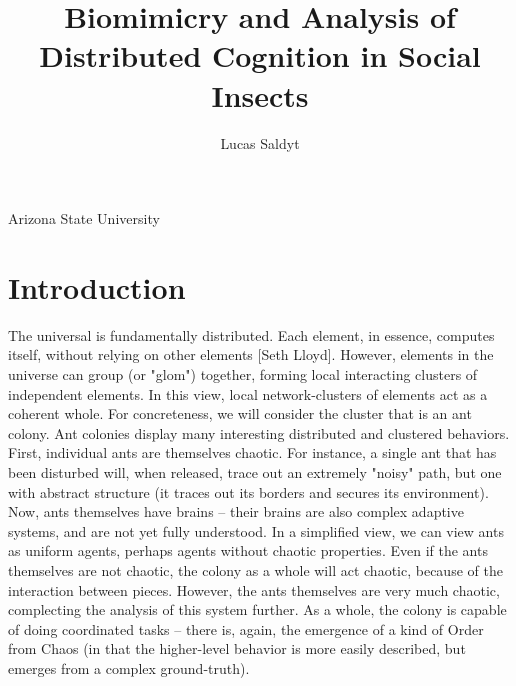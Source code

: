 \documentclass{nature}
\title{Biomimicry and Analysis of Distributed Cognition in Social Insects}
\author{Lucas Saldyt}
\begin{document}
\maketitle

\begin{affiliations}
 \item Arizona State University
\end{affiliations}

\begin{abstract}
\end{abstract}

\section{Introduction}

The universal is fundamentally distributed.
Each element, in essence, computes itself, without relying on other elements [Seth Lloyd].
However, elements in the universe can group (or "glom") together, forming local interacting clusters of independent elements.
In this view, local network-clusters of elements act as a coherent whole.
For concreteness, we will consider the cluster that is an ant colony. 
Ant colonies display many interesting distributed and clustered behaviors.
First, individual ants are themselves chaotic. 
For instance, a single ant that has been disturbed will, when released, trace out an extremely "noisy" path, but one with abstract structure (it traces out its borders and secures its environment).
Now, ants themselves have brains -- their brains are also complex adaptive systems, and are not yet fully understood. 
In a simplified view, we can view ants as uniform agents, perhaps agents without chaotic properties.
Even if the ants themselves are not chaotic, the colony as a whole will act chaotic, because of the interaction between pieces.
However, the ants themselves are very much chaotic, complecting the analysis of this system further.
As a whole, the colony is capable of doing coordinated tasks -- there is, again, the emergence of a kind of Order from Chaos (in that the higher-level behavior is more easily described, but emerges from a complex ground-truth). 
\end{document}
